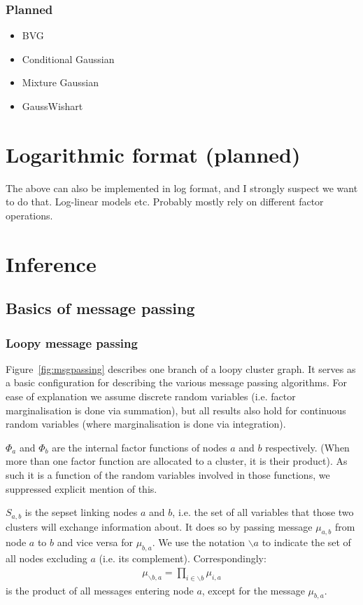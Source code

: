 \documentclass[oneside,english]{scrbook}
\begin{document}
\section{Planned}
\begin{itemize}
\item BVG
\item Conditional Gaussian
\item Mixture Gaussian
\item GaussWishart
\end{itemize}

\part{Logarithmic format (planned)}

The above can also be implemented in log format, and I strongly suspect
we want to do that. Log-linear models etc. Probably mostly rely on
different factor operations.

\part{Inference}
\chapter{Basics of message passing}

\section{Loopy message passing}

Figure~\ref{fig:msgpassing} describes one branch of a loopy cluster
graph. It serves as a basic configuration for describing the various
message passing algorithms. For ease of explanation we assume discrete
random variables (i.e. factor marginalisation is done via summation),
but all results also hold for continuous random variables (where
marginalisation is done via integration).

$\Phi_a$ and $\Phi_b$ are the internal factor functions of nodes $a$
and $b$ respectively. (When more than one factor function are
allocated to a cluster, it is their product). As such it is a function
of the random variables involved in those functions, we suppressed
explicit mention of this.

$S_{a,b}$ is the sepset linking nodes $a$ and $b$, i.e. the set of all
variables that those two clusters will exchange information about. It
does so by passing message $\mu_{a,b}$ from node $a$ to $b$ and vice
versa for $\mu_{b,a}$.  We use the notation $\backslash a$ to indicate
the set of all nodes excluding $a$ (i.e. its
complement). Correspondingly:
\begin{align}
  \mu_{\backslash b,a} = \prod_{i \in \backslash b} \mu_{i,a} \nonumber
\end{align}
is the product of all messages entering node $a$, except for the
message $\mu_{b,a}$.
\end{document}
